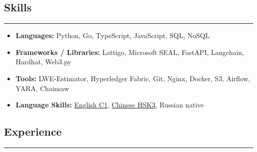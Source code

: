 \documentclass[11pt,letterpaper]{article}
\begin{document}
\subsection*{\Large Skills}
\vspace{-0.5em}
\hrule
\vspace{0.3em}

\begin{itemize}[leftmargin=0em, noitemsep]
    \renewcommand\labelitemi{}
    \item \textbf{Languages:} Python, Go, TypeScript, JavaScript, SQL, NoSQL
    \item \textbf{Frameworks / Libraries:} Lattigo, Microsoft SEAL, FastAPI, Langchain, Hardhat, Web3.py
    \item \textbf{Tools:} LWE-Estimator, Hyperledger Fabric, Git, Nginx, Docker, S3, Airflow, YARA, Chainsaw
    \item \textbf{Language Skills:}
    \href{https://certs.duolingo.com/751e0ef152565727b6d5fd909699ceaa}{English C1},
    \href{https://admin.chinesetest.cn/queryScore.do?sid=c2tActR9Wb%2704b861aefbdc5e9fd0b44afa717d08cbceb0720e582ce25f%2724d7sWsQ5nVUQSwD}{Chinese HSK3},
    Russian native
\end{itemize}

\vspace{0.2cm}

\subsection*{\Large Experience}
\vspace{-0.5em}
\hrule
\vspace{0.3em}
\end{document}
